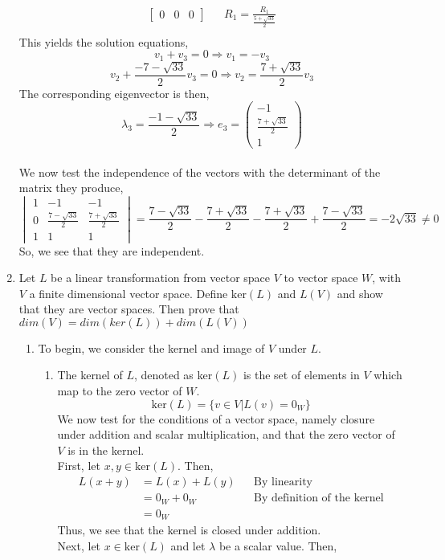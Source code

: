\documentclass[letterpaper,10pt]{article}
\begin{document}
\begin{enumerate}
\begin{align*}
\begin{bmatrix}
0 & 0 & 0
\end{bmatrix} && R_1=\frac{R_1}{\frac{5+\sqrt{33}}{2}}\\
\end{align*}
This yields the solution equations,
\[v_1+v_3=0\Rightarrow v_1=-v_3\]
\[v_2+\frac{-7-\sqrt{33}}{2} v_3 = 0\Rightarrow v_2=\frac{7+\sqrt{33}}{2}v_3\]
The corresponding eigenvector is then,
\[\lambda_3=\frac{-1-\sqrt{33}}{2} \Rightarrow e_3=\begin{pmatrix}
-1\\\frac{7+\sqrt{33}}{2}\\1
\end{pmatrix}\]\\
We now test the independence of the vectors with the determinant of the matrix they produce,
\[\begin{vmatrix}
1 & -1 & -1\\
0 & \frac{7-\sqrt{33}}{2} & \frac{7+\sqrt{33}}{2}\\
1 & 1 & 1
\end{vmatrix}=\frac{7-\sqrt{33}}{2}-\frac{7+\sqrt{33}}{2}-\frac{7+\sqrt{33}}{2}+\frac{7-\sqrt{33}}{2}=-2\sqrt{33}\neq0\]
So, we see that they are independent.
\addtocounter{enumi}{1}
\newpage
\item Let $L$ be a linear transformation from vector space $V$ to vector space $W$, with $V$ a finite dimensional vector space. Define $\text{ker}(L)$ and $L(V)$ and show that they are vector spaces. Then prove that $dim(V)=dim(ker(L))+dim(L(V))$
\begin{enumerate}
\item To begin, we consider the kernel and image of $V$ under $L$.
\begin{enumerate}
\item The kernel of $L$, denoted as ker$(L)$ is the set of elements in $V$ which map to the zero vector of $W$.
\[\text{ker}(L)=\{v\in V\big| L(v)=0_W\}\]
We now test for the conditions of a vector space, namely closure under addition and scalar multiplication, and that the zero vector of $V$ is in the kernel.\\
First, let $x,y\in \text{ker}(L)$. Then,
\begin{align*}
L(x+y) &= L(x)+L(y) && \text{By linearity}\\
&= 0_W+0_W && \text{By definition of the kernel}\\
&= 0_W
\end{align*}
Thus, we see that the kernel is closed under addition.\\
Next, let $x\in \text{ker}(L)$ and let $\lambda$ be a scalar value. Then,

\end{enumerate}
\end{enumerate}
\end{enumerate}
\end{document}
